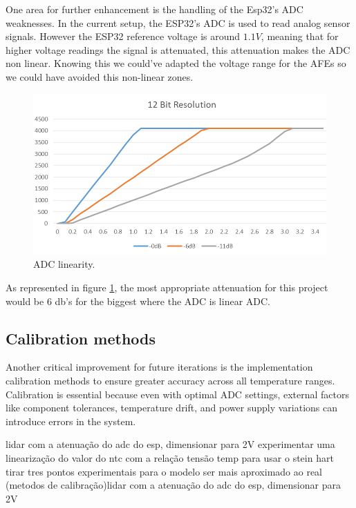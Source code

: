 \documentclass[12pt]{article}
\begin{document}
One area for further enhancement is the handling of the Esp32's ADC weaknesses. In the current setup, the ESP32's ADC is used to read analog sensor signals. However the ESP32 reference voltage is around $1.1V$, meaning that for higher voltage readings the signal is attenuated, this attenuation makes the ADC non linear. 
Knowing this we could've adapted the voltage range for the AFEs so we could have avoided this non-linear zones. 

\begin{figure}[H] 
    \centering
    \includegraphics*[scale = 0.4]{images/ADC-linearity-test-at-12-bit-resolution.png}
    \caption{ADC linearity\cite{ESP32_microcontroller}.}
    \label{fig:ADClinear}
\end{figure}

As represented in figure \ref{fig:ADClinear}, the most appropriate attenuation for this project would be 6 db's for the biggest where the ADC is linear ADC.

\subsection{ Calibration methods }

Another critical improvement for future iterations is the implementation calibration methods to ensure greater accuracy across all temperature ranges. Calibration is essential because even with optimal ADC settings, external factors like component tolerances, temperature drift, and power supply variations can introduce errors in the system.


lidar com a atenuação do adc do esp, dimensionar para 2V
experimentar uma linearização do valor do ntc com a relação tensão temp
para usar o stein hart tirar tres pontos experimentais para o modelo ser mais aproximado ao real 
(metodos de calibração)lidar com a atenuação do adc do esp, dimensionar para 2V

\end{document}
